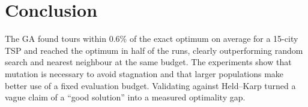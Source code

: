 \documentclass[11pt,a4paper]{article}
\begin{document}
\section{Conclusion}
The GA found tours within 0.6\% of the exact optimum on average for a 15-city TSP and reached the optimum in
half of the runs, clearly outperforming random search and nearest neighbour at the same budget. The experiments
show that mutation is necessary to avoid stagnation and that larger populations make better use of a fixed
evaluation budget. Validating against Held--Karp turned a vague claim of a ``good solution'' into a measured
optimality gap.
\end{document}
